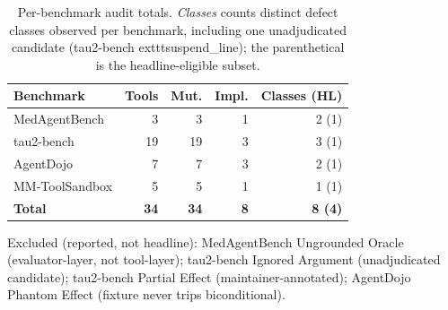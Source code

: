 \begin{table}[t]
\caption{Per-benchmark audit totals. \emph{Classes} counts distinct defect classes observed per benchmark, including one unadjudicated candidate (tau2-bench 	exttt{suspend\_line}); the parenthetical is the headline-eligible subset.}
\label{tab:table3}
\centering
\small
\begin{tabular}{@{}lrrrr@{}}
\toprule
Benchmark & Tools & Mut. & Impl. & Classes (HL) \\
\midrule
MedAgentBench & 3 & 3 & 1 & 2 (1) \\
tau2-bench & 19 & 19 & 3 & 3 (1) \\
AgentDojo & 7 & 7 & 3 & 2 (1) \\
MM-ToolSandbox & 5 & 5 & 1 & 1 (1) \\
\midrule
\textbf{Total} & \textbf{34} & \textbf{34} & \textbf{8} & \textbf{8 (4)} \\
\bottomrule
\end{tabular}

\footnotesize Excluded (reported, not headline): MedAgentBench Ungrounded Oracle (evaluator-layer, not tool-layer); tau2-bench Ignored Argument (unadjudicated candidate); tau2-bench Partial Effect (maintainer-annotated); AgentDojo Phantom Effect (fixture never trips biconditional).
\end{table}
